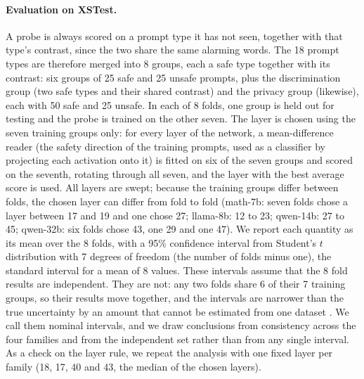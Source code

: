 \documentclass[10pt]{article}
\begin{document}
\paragraph{Evaluation on XSTest.} A probe is always scored on a prompt type it has not seen, together with that type's contrast, since the two share the same alarming words. The 18 prompt types are therefore merged into 8 groups, each a safe type together with its contrast: six groups of 25 safe and 25 unsafe prompts, plus the discrimination group (two safe types and their shared contrast) and the privacy group (likewise), each with 50 safe and 25 unsafe. In each of 8 folds, one group is held out for testing and the probe is trained on the other seven. The layer is chosen using the seven training groups only: for every layer of the network, a mean-difference reader (the safety direction of the training prompts, used as a classifier by projecting each activation onto it) is fitted on six of the seven groups and scored on the seventh, rotating through all seven, and the layer with the best average score is used. All layers are swept; because the training groups differ between folds, the chosen layer can differ from fold to fold (math-7b: seven folds chose a layer between 17 and 19 and one chose 27; llama-8b: 12 to 23; qwen-14b: 27 to 45; qwen-32b: six folds chose 43, one 29 and one 47). We report each quantity as its mean over the 8 folds, with a 95\% confidence interval from Student's $t$ distribution with 7 degrees of freedom (the number of folds minus one), the standard interval for a mean of 8 values. These intervals assume that the 8 fold results are independent. They are not: any two folds share 6 of their 7 training groups, so their results move together, and the intervals are narrower than the true uncertainty by an amount that cannot be estimated from one dataset \citep{bengio2004}. We call them nominal intervals, and we draw conclusions from consistency across the four families and from the independent set rather than from any single interval. As a check on the layer rule, we repeat the analysis with one fixed layer per family (18, 17, 40 and 43, the median of the chosen layers).
\end{document}
